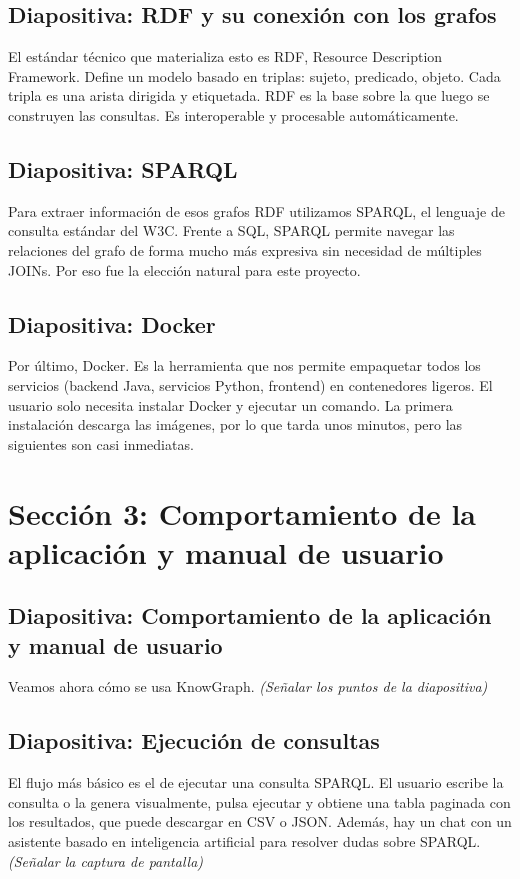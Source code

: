 \documentclass{article}
\begin{document}
\subsection*{Diapositiva: RDF y su conexión con los grafos}
El estándar técnico que materializa esto es RDF, Resource Description Framework. Define un modelo basado en triplas: sujeto, predicado, objeto. Cada tripla es una arista dirigida y etiquetada. RDF es la base sobre la que luego se construyen las consultas. Es interoperable y procesable automáticamente.

\subsection*{Diapositiva: SPARQL}
Para extraer información de esos grafos RDF utilizamos SPARQL, el lenguaje de consulta estándar del W3C. Frente a SQL, SPARQL permite navegar las relaciones del grafo de forma mucho más expresiva sin necesidad de múltiples JOINs. Por eso fue la elección natural para este proyecto.

\subsection*{Diapositiva: Docker}
Por último, Docker. Es la herramienta que nos permite empaquetar todos los servicios (backend Java, servicios Python, frontend) en contenedores ligeros. El usuario solo necesita instalar Docker y ejecutar un comando. La primera instalación descarga las imágenes, por lo que tarda unos minutos, pero las siguientes son casi inmediatas.

\section*{Sección 3: Comportamiento de la aplicación y manual de usuario}

\subsection*{Diapositiva: Comportamiento de la aplicación y manual de usuario}
Veamos ahora cómo se usa KnowGraph. \textit{(Señalar los puntos de la diapositiva)}

\subsection*{Diapositiva: Ejecución de consultas}
El flujo más básico es el de ejecutar una consulta SPARQL. El usuario escribe la consulta o la genera visualmente, pulsa ejecutar y obtiene una tabla paginada con los resultados, que puede descargar en CSV o JSON. Además, hay un chat con un asistente basado en inteligencia artificial para resolver dudas sobre SPARQL. \textit{(Señalar la captura de pantalla)}
\end{document}
